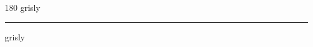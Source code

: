 
\begin{frame}
\begin{center}
\begin{turn}{180}
{\fontsize{2.5cm}{1em}\selectfont grisly}
\end{turn}
\vspace{1em}\par  
\hrule
\vspace{1em}\par  
{\fontsize{2.5cm}{1em}\selectfont grisly}
\end{center}
\end{frame}
